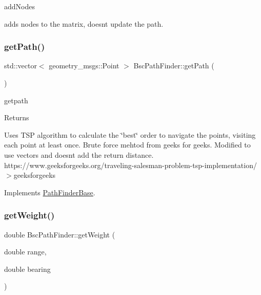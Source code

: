 add\+Nodes 

adds nodes to the matrix, doesnt update the path. \mbox{\label{classBscPathFinder_abbcde7b0e482fdc4f3fb1428c88bccb5}} 
\subsubsection{\texorpdfstring{get\+Path()}{getPath()}}
{\footnotesize\ttfamily std\+::vector$<$ geometry\+\_\+msgs\+::\+Point $>$ Bsc\+Path\+Finder\+::get\+Path (\begin{DoxyParamCaption}{ }\end{DoxyParamCaption})\hspace{0.3cm}{\ttfamily [virtual]}}



getpath 

\begin{DoxyReturn}{Returns}

\end{DoxyReturn}
Uses T\+SP algorithm to calculate the \char`\"{}best\char`\"{} order to navigate the points, visiting each point at least once. Brute force mehtod from geeks for geeks. Modified to use vectors and doesnt add the return distance. https\+://www.\+geeksforgeeks.\+org/traveling-\/salesman-\/problem-\/tsp-\/implementation/$>$geeksforgeeks

Implements \hyperlink{classPathFinderBase_aa254c2b8392f028898f691920341caa0}{Path\+Finder\+Base}.

\mbox{\label{classBscPathFinder_a0b0e1491b8819d4882575c39bb5def82}} 
\subsubsection{\texorpdfstring{get\+Weight()}{getWeight()}}
{\footnotesize\ttfamily double Bsc\+Path\+Finder\+::get\+Weight (\begin{DoxyParamCaption}\item[{double}]{range,  }\item[{double}]{bearing }\end{DoxyParamCaption})\hspace{0.3cm}{\ttfamily [protected]}}



